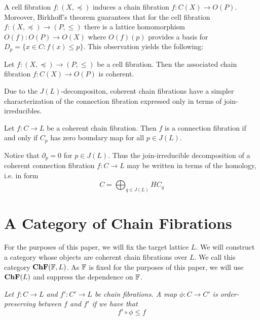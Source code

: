 A cell fibration $f:(X,\preceq)$ induces a chain fibration $f:C(X)\to O(P)$.  Moreover, Birkhoff's theorem guarantees that for the cell fibration $f:(X,\preceq)\to (P,\leq)$ there is a lattice homomorphism $O(f):O(P)\to O(X)$ where $O(f)(p)$ provides a basis for $D_p=\{x\in C:f(x)\leq p \}$.  This observation yields the following:

\begin{prop}
Let $f:(X,\preceq) \to (P,\leq)$ be a cell fibration. Then the associated chain fibration $f:C(X) \to O(P)$ is  coherent.
\end{prop}



Due to the $J(L)$-decompositon, coherent chain fibrations have a simpler characterization of the connection fibration expressed only in terms of join-irreducibles. 


\begin{prop}
Let $f:C\to L$ be a coherent chain fibration.  Then $f$ is a connection fibration if and only if $C_p$ has zero boundary map for all $p\in J(L)$.
\end{prop}



\begin{rem}
Notice that $\partial_p = 0$ for  $p\in J(L)$.  Thus the join-irreducible decomposition of a coherent connection fibration $f:C\to L$ may be written in terms of the homology, i.e. in form $$C=\bigoplus_{q\in J(L)} HC_q$$
\end{rem}



\section{A Category of Chain Fibrations}


For the purposes of this paper, we will fix the target lattice $L$.  We will construct a category whose objects are coherent chain fibrations over $L$.  We call this category ${\bf ChF}({\mathbb{F}}, L)$.  As ${\mathbb{F}}$ is fixed for the purposes of this paper, we will use ${\bf ChF}(L)$ and suppress the dependence on ${\mathbb{F}}$.


\begin{defn}
{\em
Let $f:C\to L$ and $f':C'\to L$ be chain fibrations.   A map $\phi:C\to C'$ is {\em order-preserving} between $f$ and $f'$ if we have that $$f'\circ \phi \leq f$$
}
\end{defn}

%

